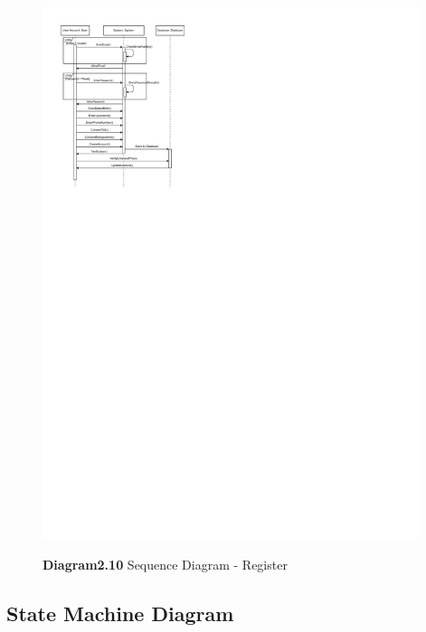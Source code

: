 \documentclass[a4paper]{article}
\begin{document}
	\begin{figure}[H]
		\centering
		\caption*{\textbf{Diagram2.10} Sequence Diagram - Register}
		\includegraphics[width = 0.98\textwidth]{images/SequenceDiagram_Register.pdf}
		\label{SD_Register}
	\end{figure}

	\subsection{State Machine Diagram}
\end{document}
